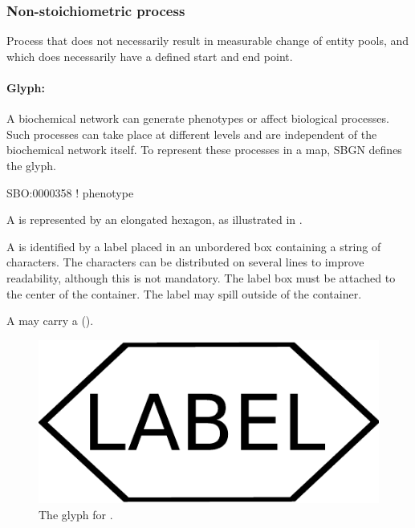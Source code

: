 \subsubsection{Non-stoichiometric process}

 Process that does not necessarily result in measurable change of entity pools, and which does necessarily have a defined start and end point. 

\paragraph{Glyph: }
\label{sec:phenotype}

A biochemical network can generate phenotypes or affect biological
processes.  Such processes can take place at different levels and are
independent of the biochemical network itself.  To represent these
processes in a map, SBGN defines the  glyph.

\begin{glyphDescription}

\glyphSboTerm SBO:0000358 ! phenotype

\glyphContainer A  is represented by an elongated
hexagon, as illustrated in .

\glyphLabel A  is identified by a label placed in an
unbordered box containing a string of characters.  The characters can be
distributed on several lines to improve readability, although this is not
mandatory.  The label box must be attached to the center of the
 container.  The label may spill outside of the container.

\glyphAux A  may carry a 
().

\end{glyphDescription}
 
\begin{figure}[H]
  \centering
  \includegraphics[scale = 0.3]{images/phenotype}
  \caption{The \PD glyph for .}
  \label{fig:phenotype}
\end{figure}


